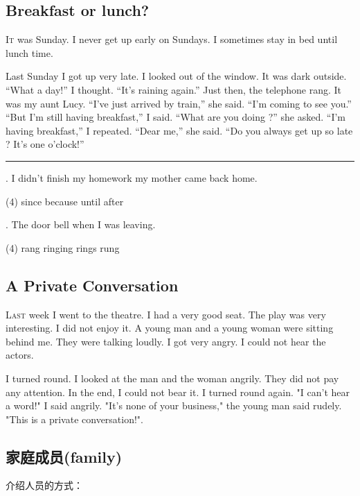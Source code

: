 \documentclass[a4paper]{article}
\begin{document}
  \subsection{Breakfast or lunch?} 
\lettrine[lines=2, lraise=0.1]{I}t was Sunday. I never get up early on Sundays. I sometimes stay in bed until lunch time.

Last Sunday I got up very late. I looked out of the window. It was dark outside.   “What a day!” I thought. “It's raining again.” Just then, the telephone rang. It was my aunt Lucy. “I've just arrived by train,” she said. “I'm coming to see you.” “But I'm still having breakfast,” I said. “What are you doing ?” she asked. “I'm having breakfast,” I repeated. “Dear me,” she said. “Do you always get up so late ? It's one o'clock!”

\noindent \rule{1.0\textwidth}{0.5mm}

. I didn't finish my homework \blank[width=1cm]{} my mother came back home.
\begin{tasks}(4)
  \task since \task because \task until \task after

\end{tasks}

. The door bell \blank[width=1cm]{} when I was leaving.
\begin{tasks}(4)
  \task rang \task ringing \task rings \task rung
\end{tasks}

  \subsection{A Private Conversation} 
\lettrine[lines=2, lraise=0.1]{L}{ast} week I went to the theatre. I had a very good seat. The play was very interesting. I did not enjoy it. A young man and a young woman were sitting behind me. They were talking loudly. I got very angry. I could not hear the actors.

I turned round. I looked at the man and the woman angrily. They did not pay any attention. In the end, I could not bear it. I turned round again. "I can't hear a word!" I said angrily.  "It's none of your business," the young man said rudely. "This is a private conversation!".

  \subsection{家庭成员(family)}
介绍人员的方式：
\end{document}
